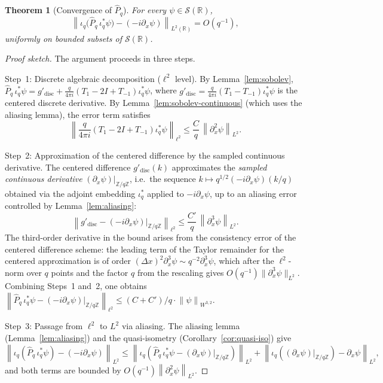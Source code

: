 \documentclass[12pt,a4paper]{article}
\newtheorem{theorem}{Theorem}[section]
\newcommand{\Zq}{\mathbb{Z}/q\mathbb{Z}}
\newcommand{\Schwartz}{\mathcal{S}(\mathbb{R})}
\newcommand{\iotaq}{\iota_q}
\newcommand{\iotastar}{\iota_q^*}
\newcommand{\Phat}{\hat{P}_q}
\newcommand{\norm}[1]{\left\|#1\right\|}
\begin{document}
    \begin{theorem}[Convergence of $\Phat$]
      \label{thm:momentum}
      For every $\psi \in \Schwartz$,
      \[
        \norm{\iotaq\bigl(\Phat\,\iotastar\psi\bigr) - (-i\partial_x\psi)}_{L^2(\mathbb{R})}
        = O\!\left(q^{-1}\right),
      \]
      uniformly on bounded subsets of $\Schwartz$.
    \end{theorem}

    \begin{proof}
      [Proof sketch]
The argument proceeds in three steps.

Step~1: Discrete algebraic decomposition ($\ell^2$ level).
By Lemma~\ref{lem:sobolev}, $\Phat\,\iotastar\psi = g'_{\mathrm{disc}} + \frac{q}{4\pi i}(T_1 - 2I + T_{-1})\iotastar\psi$,
where $g'_{\mathrm{disc}} = \frac{q}{4\pi i}(T_1 - T_{-1})\iotastar\psi$ is the centered discrete derivative.
By Lemma~\ref{lem:sobolev-continuous} (which uses the aliasing lemma), the error term satisfies
\[
  \left\|\frac{q}{4\pi i}(T_1 - 2I + T_{-1})\iotastar\psi\right\|_{\ell^2}
  \leq \frac{C}{q}\,\norm{\partial_x^2\psi}_{L^2}.
\]

Step~2: Approximation of the centered difference by the sampled continuous derivative.
The centered difference $g'_{\mathrm{disc}}(k)$ approximates
the \emph{sampled continuous derivative}
$(\partial_x\psi)|_{\mathbb{Z}/q\mathbb{Z}}$, i.e.\ the sequence $k \mapsto q^{1/2}(-i\partial_x\psi)(k/q)$
obtained via the adjoint embedding $\iotastar$ applied to $-i\partial_x\psi$,
up to an aliasing error controlled by Lemma~\ref{lem:aliasing}:
\[
  \norm{g'_{\mathrm{disc}} - (-i\partial_x\psi)|_{\mathbb{Z}/q\mathbb{Z}}}_{\ell^2}
  \leq \frac{C'}{q}\,\norm{\partial_x^3\psi}_{L^2}.
\]
The third-order derivative in the bound arises from the consistency error of the
centered difference scheme: the leading term of the Taylor remainder for the centered
approximation is of order $(\Delta x)^2 \partial_x^3\psi \sim q^{-2}\partial_x^3\psi$,
which after the $\ell^2$-norm over $q$ points and the factor $q$ from the rescaling
gives $O(q^{-1})\|\partial_x^3\psi\|_{L^2}$.
Combining Steps~1 and~2, one obtains
$\norm{\Phat\,\iotastar\psi - (-i\partial_x\psi)|_{\mathbb{Z}/q\mathbb{Z}}}_{\ell^2} \leq (C + C')/q
\cdot \norm{\psi}_{W^{3,2}}$.

Step~3: Passage from $\ell^2$ to $L^2$ via aliasing.
The aliasing lemma (Lemma~\ref{lem:aliasing}) and the quasi-isometry
(Corollary~\ref{cor:quasi-iso}) give
\[
  \norm{\iotaq(\Phat\,\iotastar\psi) - (-i\partial_x\psi)}_{L^2}
  \leq \norm{\iotaq(\Phat\,\iotastar\psi - (\partial_x\psi)|_{\Zq})}_{L^2}
  + \norm{\iotaq((\partial_x\psi)|_{\Zq}) - \partial_x\psi}_{L^2},
\]
and both terms are bounded by $O(q^{-1})\norm{\partial_x^2\psi}_{L^2}$.
    \end{proof}
\end{document}
